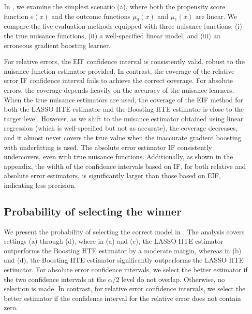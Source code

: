 \documentclass{article}
\theoremstyle{plain}
\theoremstyle{definition}
\theoremstyle{plain}
\begin{document}
In , we examine the simplest scenario (a), where both the propensity score function $e(x)$ and the outcome functions $\mu_0(x)$ and $\mu_1(x)$ are linear. We compare the five evaluation methods equipped with three nuisance functions: (i) the true nuisance functions, (ii) a well-specified linear model, and (iii) an erroneous gradient boosting learner.


For relative errors, the EIF confidence interval is consistently valid, robust to the nuisance function estimator provided.
In contrast, the coverage of the relative error IF confidence interval fails to achieve the correct coverage.
For absolute errors, the coverage depends heavily on the accuracy of the nuisance learners. 
When the true nuisance estimators are used, the coverage of the EIF method for both the LASSO HTE estimator and the Boosting HTE estimator is close to the target level. However, as we shift to the nuisance estimator obtained using linear regression (which is well-specified but not as accurate), the coverage decreases, and it almost never covers the true value when the inaccurate gradient boosting with underfitting is used. 
The absolute error estimator IF consistently undercovers, even with true nuisance functions.
Additionally, as shown in the appendix, 
the width of the confidence intervals based on IF, for both relative and absolute error estimators, is significantly larger than those based on EIF, indicating less precision.


\subsection{Probability of selecting the winner}\label{sec:selection.accuracy}

We present the probability of selecting the correct model in . The analysis covers settings (a) through (d), where in (a) and (c), the LASSO HTE estimator outperforms the Boosting HTE estimator by a moderate margin, whereas in (b) and (d), the Boosting HTE estimator significantly outperforms the LASSO HTE estimator.
For absolute error confidence intervals, we select the better estimator if the two confidence intervals at the $\alpha/2$ level do not overlap. Otherwise, no selection is made. 
In contrast, for relative error confidence intervals, we select the better estimator if the confidence interval for the relative error does not contain zero.
\end{document}

